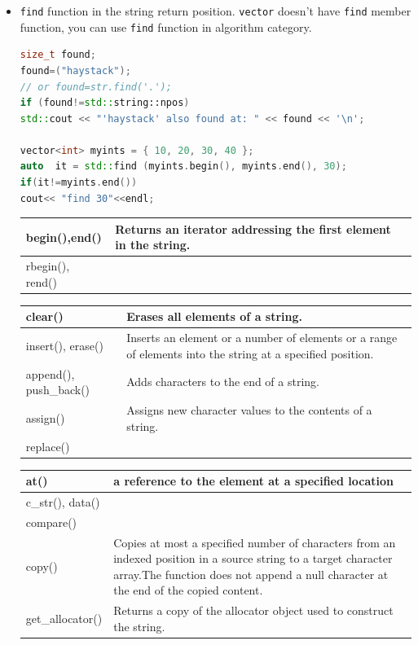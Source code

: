 \documentclass[a4paper,11pt,twoside]{book}
\newcommand{\tophline}{\hline }
\newcommand{\bottomhline}{\\ \hline }
\newcommand{\tophline}{ }
\newcommand{\bottomhline}{ }
\begin{document}
\begin{itemize}
	\item \texttt{find} function in the string return position. \texttt{vector} doesn't have \texttt{find} member function, you can use \texttt{find} function in  algorithm category.
	
\begin{lstlisting}[frame=single, language=c++]
size_t found;
found=("haystack");
// or found=str.find('.');
if (found!=std::string::npos)
std::cout << "'haystack' also found at: " << found << '\n';
	
vector<int> myints = { 10, 20, 30, 40 };
auto  it = std::find (myints.begin(), myints.end(), 30);
if(it!=myints.end())
cout<< "find 30"<<endl;
\end{lstlisting}
	
	
	\begin{tabular}{| p{} |p{}|}
		\tophline
		begin(),end() & Returns an iterator addressing the first element in the string.\\
		\tophline
		rbegin(), rend() & \bottomhline
		
	\end{tabular}
	
	\begin{tabular}{| p{} |p{}|}
		\tophline
		clear()& Erases all elements of a string.\\
		\tophline
		insert(), erase() & Inserts an element or a number of elements or a range of elements into the string at a specified position.\\
		\tophline
		append(), push\_back() & Adds characters to the end of a string.\\
		\tophline
		assign() &Assigns new character values to the contents of a string.\\
		\tophline
		replace() & \bottomhline
	\end{tabular}
	
	\begin{tabular}{| p{} |p{}|}
		
		\tophline
		at() & a reference to the element at a specified location \\
		\tophline
		c\_str(), data() & \\
		\tophline
		compare()& \\
		\tophline
		copy() & Copies at most a specified number of characters from an indexed position in a source string to a target character array.The function does not append a null character at the end of the copied content.
		\\
		\tophline
		get\_allocator() & Returns a copy of the allocator object used to construct the string.\\
		

\end{tabular}
\end{itemize}
\end{document}

